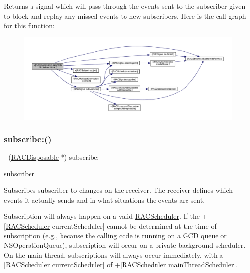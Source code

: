 Returns a signal which will pass through the events sent to the subscriber given to {\ttfamily block} and replay any missed events to new subscribers. Here is the call graph for this function\+:\nopagebreak
\begin{figure}[H]
\begin{center}
\leavevmode
\includegraphics[width=350pt]{interface_r_a_c_signal_adbef9afea68ea6a2a81bb3115f47c22c_cgraph}
\end{center}
\end{figure}
\mbox{\label{interface_r_a_c_signal_aeab76d632d98bbc321ec5e19575377eb}} 
\subsubsection{\texorpdfstring{subscribe\+:()}{subscribe:()}\hspace{0.1cm}{\footnotesize\ttfamily [1/3]}}
{\footnotesize\ttfamily -\/ (\mbox{\hyperlink{interface_r_a_c_disposable}{R\+A\+C\+Disposable}} $\ast$) subscribe\+: \begin{DoxyParamCaption}\item[{(id$<$ \mbox{\hyperlink{interface_r_a_c_subscriber}{R\+A\+C\+Subscriber}} $>$)}]{subscriber }\end{DoxyParamCaption}}

Subscribes {\ttfamily subscriber} to changes on the receiver. The receiver defines which events it actually sends and in what situations the events are sent.

Subscription will always happen on a valid \mbox{\hyperlink{interface_r_a_c_scheduler}{R\+A\+C\+Scheduler}}. If the +\mbox{[}\mbox{\hyperlink{interface_r_a_c_scheduler}{R\+A\+C\+Scheduler}} current\+Scheduler\mbox{]} cannot be determined at the time of subscription (e.\+g., because the calling code is running on a G\+CD queue or N\+S\+Operation\+Queue), subscription will occur on a private background scheduler. On the main thread, subscriptions will always occur immediately, with a +\mbox{[}\mbox{\hyperlink{interface_r_a_c_scheduler}{R\+A\+C\+Scheduler}} current\+Scheduler\mbox{]} of +\mbox{[}\mbox{\hyperlink{interface_r_a_c_scheduler}{R\+A\+C\+Scheduler}} main\+Thread\+Scheduler\mbox{]}.

